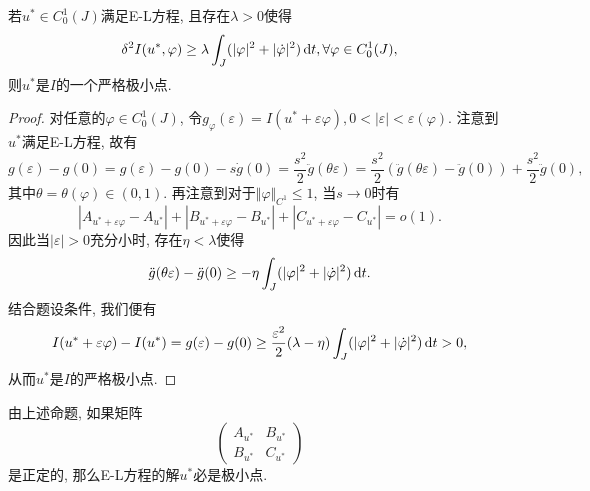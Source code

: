 \begin{proposition}[充分条件1]\label{prop1.10}
    若$u^* \in C_0^1(J)$满足E-L方程, 且存在$\lambda > 0$使得
    \begin{equation*}
        \delta^2I(u^*, \varphi) \geq \lambda\int_J(|\varphi|^2+|\dot\varphi|^2) \,{\rm d}t, \forall \varphi \in C_0^1(J),
    \end{equation*}
    则$u^*$是$I$的一个严格极小点.
    \begin{proof}
        对任意的$\varphi \in C_0^1(J)$, 令$g_{\varphi}(\varepsilon) = I(u^* + \varepsilon\varphi), 0 < |\varepsilon| < \varepsilon(\varphi)$.
        注意到$u^*$满足E-L方程, 故有 
        \begin{equation*}
            g(\varepsilon) - g(0) = g(\varepsilon) - g(0) - s\dot g(0) = \frac{s^2}{2}\ddot g(\theta \varepsilon) = \frac{s^2}{2}(\ddot g(\theta \varepsilon) - \ddot g(0)) + \frac{s^2}{2}\ddot g(0), 
        \end{equation*}
        其中$\theta = \theta(\varphi) \in (0, 1)$. 再注意到对于$\Vert \varphi \Vert_{C^1} \leq 1$, 当$s \rightarrow 0$时有 
        \begin{equation*}
            |A_{u^* + \varepsilon\varphi} - A_{u^*}| + |B_{u^* + \varepsilon\varphi} - B_{u^*}| + |C_{u^* + \varepsilon\varphi} - C_{u^*}| = o(1).
        \end{equation*}
        因此当$|\varepsilon| > 0$充分小时, 存在$\eta < \lambda$使得 
        \begin{equation*}
            \ddot g(\theta \varepsilon) - \ddot g(0) \geq -\eta\int_J(|\varphi|^2 + |\dot\varphi|^2) \,{\rm d}t.
        \end{equation*}
        结合题设条件, 我们便有
        \begin{equation*}
            I(u^* + \varepsilon\varphi) - I(u^*) = g(\varepsilon) - g(0) \geq \frac{\varepsilon^2}{2}(\lambda - \eta)\int_J(|\varphi|^2 + |\dot\varphi|^2) \,{\rm d}t > 0,
        \end{equation*} 
        从而$u^*$是$I$的严格极小点.
    \end{proof}
\end{proposition}

\begin{remark}
    由上述命题, 如果矩阵
    \begin{equation*}
        \begin{pmatrix} 
            A_{u^*} & B_{u^*} \\ 
            B_{u^*} & C_{u^*} 
        \end{pmatrix} 
    \end{equation*} 
    是正定的, 那么E-L方程的解$u^*$必是极小点.
\end{remark}

